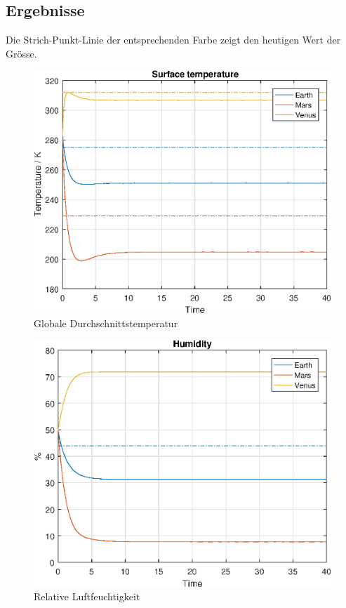 \begin{refsection}
\subsection{Ergebnisse}

		Die Strich-Punkt-Linie der entsprechenden Farbe zeigt den heutigen Wert der Grösse. 

		\begin{figure}
			\center
			\includegraphics[height=0.45\textheight]{planeten/Matlab/figures/surfaceTemperature.eps}
			\caption{Globale Durchschnittstemperatur}
		\end{figure}
		
		\begin{figure}
			\center
			\includegraphics[height=0.45\textheight]{planeten/Matlab/figures/humidity.eps}
			\caption{Relative Luftfeuchtigkeit}
		\end{figure}
		

\end{refsection}
